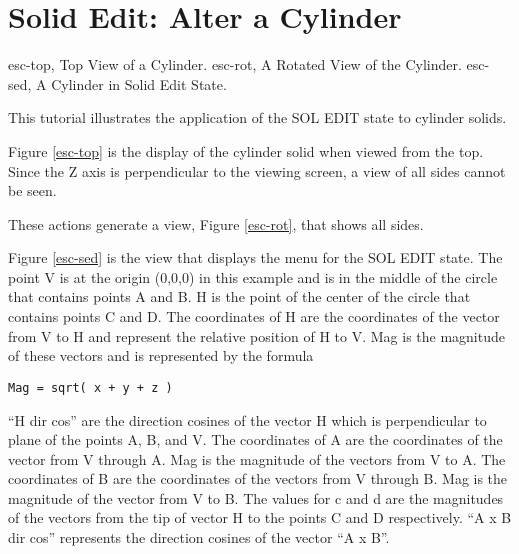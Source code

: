 \section{Solid Edit: Alter a Cylinder}
\mfig esc-top, Top View of a Cylinder.
\mfig esc-rot, A Rotated View of the Cylinder.
\mfig esc-sed, A Cylinder in Solid Edit State.

This tutorial illustrates the application of the SOL EDIT state to
cylinder solids.


Figure \ref{esc-top} is the display of the cylinder solid
when viewed from the top.
Since the
Z axis is perpendicular to the viewing screen, a view of all sides cannot be
seen.


These actions generate a view, Figure \ref{esc-rot}, that shows all sides.


Figure \ref{esc-sed} is the view that displays the menu
for the SOL EDIT state.
The
point V is at the origin (0,0,0) in this example and is in the middle of the
circle that contains points A and B.  H is the point of the center of the
circle that contains points C and D.  The coordinates of H are the coordinates
of the vector from V to H and represent the relative position of H to V.  Mag
is the magnitude of these vectors and is represented by the formula
\begin{center}
\begin{verbatim}
Mag = sqrt( x + y + z )
\end{verbatim}
\end{center}

``H dir cos'' are the direction cosines of the vector H which
is perpendicular to plane of the points A, B, and V.  The coordinates of A
are the coordinates of the vector from V through A.  Mag is the magnitude of
the vectors from V to A.  The coordinates of B are the coordinates of the
vectors from V through B.  Mag is the magnitude of the vector from V to B. 
The values for c and d are the magnitudes of the vectors from the tip of
vector H to the points C
and D respectively.
``A x B dir cos'' represents the direction cosines of the
vector ``A x B''.

